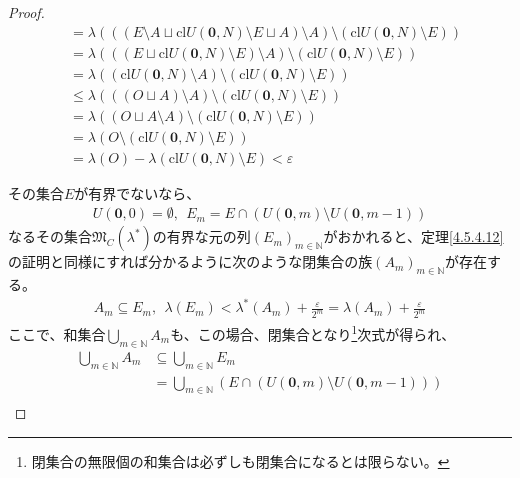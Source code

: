 \documentclass[dvipdfmx]{jsarticle}
\begin{document}
\begin{proof}
\begin{align*}
&= \lambda\left( \left( \left( E \setminus A \sqcup \mathrm{cl}{U\left( \mathbf{0},N \right)} \setminus E \sqcup A \right) \setminus A \right) \setminus \left( \mathrm{cl}{U\left( \mathbf{0},N \right)} \setminus E \right) \right)\\
&= \lambda\left( \left( \left( E \sqcup \mathrm{cl}{U\left( \mathbf{0},N \right)} \setminus E \right) \setminus A \right) \setminus \left( \mathrm{cl}{U\left( \mathbf{0},N \right)} \setminus E \right) \right)\\
&= \lambda\left( \left( \mathrm{cl}{U\left( \mathbf{0},N \right)} \setminus A \right) \setminus \left( \mathrm{cl}{U\left( \mathbf{0},N \right)} \setminus E \right) \right)\\
&\leq \lambda\left( \left( (O \sqcup A) \setminus A \right) \setminus \left( \mathrm{cl}{U\left( \mathbf{0},N \right)} \setminus E \right) \right)\\
&= \lambda\left( (O \sqcup A \setminus A) \setminus \left( \mathrm{cl}{U\left( \mathbf{0},N \right)} \setminus E \right) \right)\\
&= \lambda\left( O \setminus \left( \mathrm{cl}{U\left( \mathbf{0},N \right)} \setminus E \right) \right)\\
&= \lambda(O) - \lambda\left( \mathrm{cl}{U\left( \mathbf{0},N \right)} \setminus E \right) < \varepsilon
\end{align*}\par
その集合$E$が有界でないなら、
\begin{align*}
U\left( \mathbf{0},0 \right) = \emptyset,\ \ E_{m} = E \cap \left( U\left( \mathbf{0},m \right) \setminus U\left( \mathbf{0},m - 1 \right) \right)
\end{align*}
なるその集合$\mathfrak{M}_{C}\left( \lambda^{*} \right)$の有界な元の列$\left( E_{m} \right)_{m \in \mathbb{N}}$がおかれると、定理\ref{4.5.4.12}の証明と同様にすれば分かるように次のような閉集合の族$\left( A_{m} \right)_{m \in \mathbb{N}}$が存在する。
\begin{align*}
A_{m} \subseteq E_{m},\ \ \lambda\left( E_{m} \right) < \lambda^{*}\left( A_{m} \right) + \frac{\varepsilon}{2^{m}} = \lambda\left( A_{m} \right) + \frac{\varepsilon}{2^{m}}
\end{align*}
ここで、和集合$\bigcup_{m \in \mathbb{N}} A_{m}$も、この場合、閉集合となり\footnote{閉集合の無限個の和集合は必ずしも閉集合になるとは限らない。}次式が得られ、
\begin{align*}
\bigcup_{m \in \mathbb{N}} A_{m} &\subseteq \bigcup_{m \in \mathbb{N}} E_{m}\\
&= \bigcup_{m \in \mathbb{N}} \left( E \cap \left( U\left( \mathbf{0},m \right) \setminus U\left( \mathbf{0},m - 1 \right) \right) \right)\\

\end{align*}
\end{proof}
\end{document}
